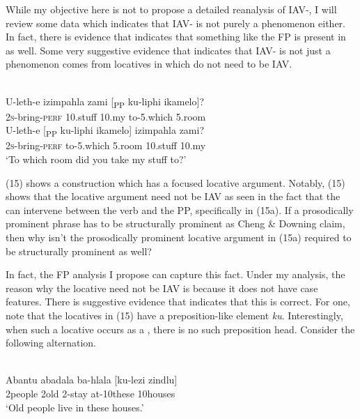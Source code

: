 \documentclass[output=paper,newtxmath,modfonts,nonflat,draft]{langsci/langscibook}
\begin{document}
While my objective here is not to propose a detailed reanalysis of  IAV-, I will review some data which indicates that  IAV- is not purely a  phenomenon either. In fact, there is evidence that indicates that something like the FP is present in  as well. Some very suggestive evidence that indicates that  IAV- is not just a  phenomenon comes from locatives in  which do not need to be IAV. 

\ea\label{ex:selvanathan:15}
 \citep[168]{Buell2009}\\
\ea\label{ex:selvanathan:15a}
	\gll U-leth-e      izimpahla  zami   [\textsubscript{PP} ku-liphi      ikamelo]? \\
	2\textsc{s}{}-bring-\textsc{perf}  10.stuff   10.my   {}     to-5.which   5.room\\
	
\ex\label{ex:selvanathan:15b}
	\gll U-leth-e          [\textsubscript{PP} ku-liphi   ikamelo]   izimpahla  zami?\\
	2\textsc{s}{}-bring-\textsc{perf}   {}   to-5.which   5.room     10.stuff     10.my\\
	\glt `To which room did you take my stuff to?'
\z
\z

(15) shows a construction which has a focused locative argument. Notably, (15) shows that the locative argument need not be IAV as seen in the fact that the  can intervene between the verb and the PP, specifically in (15a). If a prosodically prominent phrase has to be structurally prominent as Cheng \& Downing claim, then why isn't the prosodically prominent locative argument in (15a) required to be structurally prominent as well? 

In fact, the FP analysis I propose can capture this fact. Under my analysis, the reason why the locative need not be IAV is because it does not have case features. There is suggestive evidence that indicates that this is correct. For one, note that the locatives in (15) have a preposition-like element \textit{ku}. Interestingly, when such a locative occurs as a , there is no such preposition head. Consider the following alternation.

\ea\label{ex:selvanathan:16}
 \citep[107]{Buell2007}\\
\ea\label{ex:selvanathan:16a}
\gll Abantu  abadala  ba-hlala  [ku-lezi   zindlu] \\
2people   2old     2-stay   at-10these   10houses\\
\glt `Old people live in these houses.' 
\end{document}
